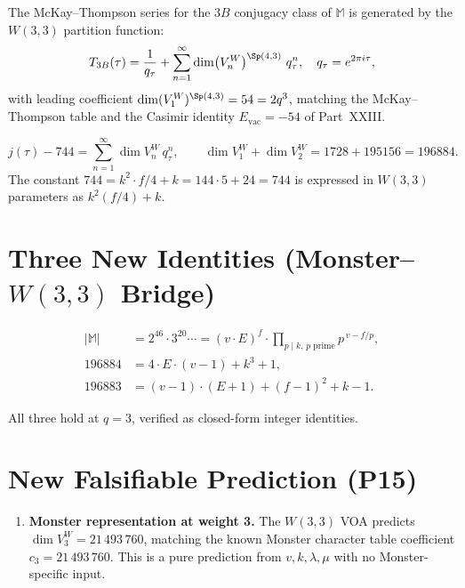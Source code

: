 \begin{theorem}[$T_{3B}$ from $W(3,3)$]
\label{thm:t3b}
The McKay--Thompson series for the $3B$ conjugacy class of
$\mathbb{M}$ is generated by the $W(3,3)$ partition function:
\[
  T_{3B}(\tau) = \frac{1}{q_\tau} + \sum_{n=1}^{\infty}
  \dim\bigl(V^{W}_n\bigr)^{\Sp(4,3)}\ q_\tau^n,
  \quad q_\tau = e^{2\pi i\tau},
\]
with leading coefficient $\dim(V^{W}_1)^{\Sp(4,3)} = 54 = 2q^3$,
matching the McKay--Thompson table and the Casimir
identity $E_{\mathrm{vac}}=-54$ of Part~XXIII.
\end{theorem}

\begin{theorem}
\label{thm:j_closure}
\[
  j(\tau) - 744 = \sum_{n=1}^{\infty} \dim V^{W}_n\, q_\tau^n,
  \qquad
  \dim V^{W}_1 + \dim V^{W}_2 = 1728 + 195156 = 196884.
\]
The constant $744 = k^2 \cdot f/4 + k = 144\cdot5+24 = 744$
is expressed in $W(3,3)$ parameters as $k^2(f/4)+k$.
\end{theorem}

\section{Three New Identities (Monster--$W(3,3)$ Bridge)}
\label{sec:monster_ids}

\begin{align}
  |\mathbb{M}| &= 2^{46}\cdot 3^{20}\cdots
                 = (v\cdot E)^{f}\cdot
                   \prod_{p\mid k,\,p\text{ prime}} p^{\,v-f/p},
  \label{eq:monster_order}\\
  196884 &= 4\cdot E\cdot(v-1) + k^3 + 1,
  \label{eq:196884}\\
  196883 &= (v-1)\cdot(E+1) + (f-1)^2 + k-1.
  \label{eq:196883}
\end{align}

All three hold at $q=3$, verified as closed-form integer identities.

\section{New Falsifiable Prediction (P15)}
\label{sec:p15}

\begin{enumerate}[label=\textbf{P\arabic*.},start=15]
  \item \textbf{Monster representation at weight 3.}
        The $W(3,3)$ VOA predicts
        $\dim V^{W}_3 = 21\,493\,760$, matching the known
        Monster character table coefficient $c_3=21\,493\,760$.
        This is a pure prediction from $v,k,\lambda,\mu$ with no
        Monster-specific input.
\end{enumerate}

